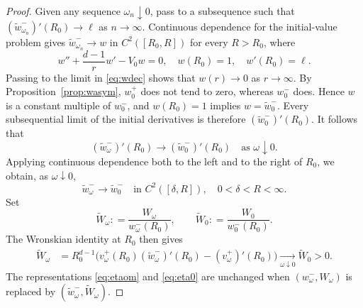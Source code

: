 \documentclass[12pt, a4paper, reqno]{amsart}
\numberwithin{equation}{section}
\theoremstyle{definition}
\theoremstyle{remark}
\newcommand{\ce}{\mathrel{\mathop:}=}
\begin{document}
\begin{proof}
Given any sequence $\omega_n\downarrow0$, pass to a subsequence
such that $(\widetilde w_{\omega_n}^-)'(R_0)\to\ell$ as $n\to\infty$.
Continuous dependence for the initial-value problem gives
$\widetilde w_{\omega_n}^-\to w$ in $C^2([R_0,R])$ for every
$R>R_0$, where
\[
  w''+\frac{d-1}{r}w'-V_0w=0,
  \quad w(R_0)=1,\quad w'(R_0)=\ell.
\]
Passing to the limit in \eqref{eq:wdec} shows that $w(r)\to0$ as
$r\to\infty$. By Proposition~\ref{prop:wasym}, $w_0^+$ does not tend
to zero, whereas $w_0^-$ does. Hence $w$ is a constant multiple of
$w_0^-$, and $w(R_0)=1$ implies $w=\widetilde w_0^-$. Every
subsequential limit of the initial derivatives is therefore
$(\widetilde w_0^-)'(R_0)$. It follows that
\[
  (\widetilde w_\omega^-)'(R_0)
  \to(\widetilde w_0^-)'(R_0)
  \quad\text{as }\omega\downarrow0.
\]
Applying continuous dependence both to the left and to the right of
$R_0$, we obtain, as $\omega\downarrow0$,
\begin{equation*}
  \widetilde w_\omega^-\to\widetilde w_0^-
  \quad\text{in }C^2([\delta,R]),
  \quad 0<\delta<R<\infty.
\end{equation*}
Set
\[
  \widetilde W_\omega\ce \frac{W_\omega}{w_\omega^-(R_0)},
  \qquad
  \widetilde W_0\ce \frac{W_0}{w_0^-(R_0)}.
\]
The Wronskian identity at $R_0$ then gives
\begin{equation}\label{eq:Wlim}
  \begin{split}
    \widetilde W_\omega
    &=R_0^{d-1}\bigl(
       v_\omega^+(R_0)(\widetilde w_\omega^-)'(R_0)
       -(v_\omega^+)'(R_0)\bigr) \xrightarrow[\omega\downarrow0]{} \widetilde W_0>0.
  \end{split}
\end{equation}
The representations \eqref{eq:etaom} and \eqref{eq:eta0} are unchanged
when $(w_\omega^-,W_\omega)$ is replaced by
$(\widetilde w_\omega^-,\widetilde W_\omega)$.


\end{proof}
\end{document}
